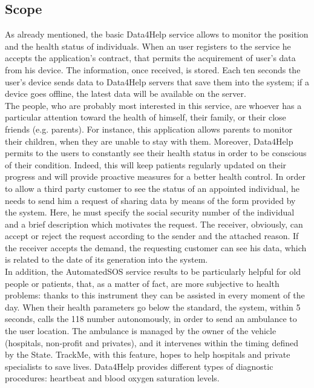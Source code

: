 \subsection{Scope}
As already mentioned, the basic Data4Help service allows to monitor the position and the health status of individuals. When an user registers to the service he accepts the application's contract, that permits the acquirement of user's data from his device. The information, once received, is stored. 
Each ten seconds the user's device sends data to Data4Help servers that save them into the system; if a device goes offline, the latest data will be available on the server.\\ 
The people, who are probably most interested in this service, are whoever has a particular attention toward the health of himself, their family, or their close friends (e.g. parents).
For instance, this application allows parents to monitor their children, when they are unable to stay with them. 
Moreover, Data4Help permits to the users to constantly see their health status in order to be conscious of their condition. Indeed, this will keep patients regularly updated on their progress and will provide proactive measures for a better health control. 
In order to allow a third party customer to see the status of an appointed individual, he needs to send him a request of sharing data by means of the form provided by the system. 
Here, he must specify the social security number of the individual and a brief description which motivates the request. 
The receiver, obviously, can accept or reject the request according to the sender and the attached reason. 
If the receiver accepts the demand, the requesting customer can see his data, which is related to the date of its generation into the system. \\ 
In addition, the AutomatedSOS service results to be particularly helpful for old people or patients, that, as a matter of fact, are more subjective to health problems: thanks to this instrument they can be assisted in every moment of the day. 
When their health parameters go below the standard, the system, within 5 seconds, calls the 118 number autonomously, in order to send an ambulance to the user location. 
The ambulance is managed by the owner of the vehicle (hospitals, non-profit and privates), and it intervenes within the timing defined by the State.
TrackMe, with this feature, hopes to help hospitals and private specialists to save lives.
Data4Help provides different types of diagnostic procedures:  heartbeat and blood oxygen saturation levels.\\ 
